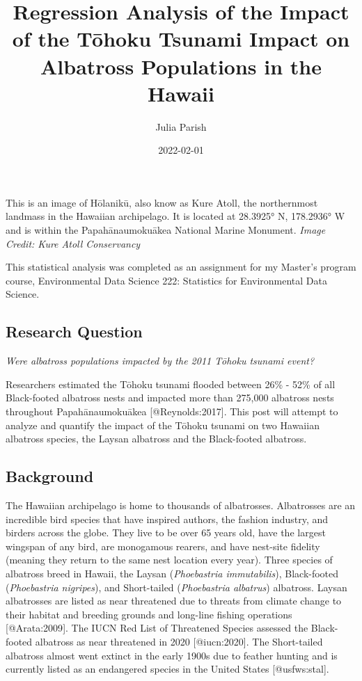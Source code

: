 \documentclass[
]{article}
\title{Regression Analysis of the Impact of the Tōhoku Tsunami Impact on
Albatross Populations in the Hawaii}
\author{Julia Parish}
\date{2022-02-01}
\begin{document}
\maketitle

{
\setcounter{tocdepth}{2}
\tableofcontents
}
This is an image of Hōlanikū, also know as Kure Atoll, the northernmost
landmass in the Hawaiian archipelago. It is located at 28.3925° N,
178.2936° W and is within the Papahānaumokuākea National Marine
Monument. \emph{Image Credit: Kure Atoll Conservancy}

This statistical analysis was completed as an assignment for my Master's
program course, Environmental Data Science 222: Statistics for
Environmental Data Science.

\hypertarget{research-question}{%
\subsection{Research Question}\label{research-question}}

\emph{Were albatross populations impacted by the 2011 Tōhoku tsunami
event?}

Researchers estimated the Tōhoku tsunami flooded between 26\% - 52\% of
all Black-footed albatross nests and impacted more than 275,000
albatross nests throughout Papahānaumokuākea {[}@Reynolds:2017{]}. This
post will attempt to analyze and quantify the impact of the Tōhoku
tsunami on two Hawaiian albatross species, the Laysan albatross and the
Black-footed albatross.

\hypertarget{background}{%
\subsection{Background}\label{background}}

The Hawaiian archipelago is home to thousands of albatrosses.
Albatrosses are an incredible bird species that have inspired authors,
the fashion industry, and birders across the globe. They live to be over
65 years old, have the largest wingspan of any bird, are monogamous
rearers, and have nest-site fidelity (meaning they return to the same
nest location every year). Three species of albatross breed in Hawaii,
the Laysan (\emph{Phoebastria immutabilis}), Black-footed
(\emph{Phoebastria nigripes}), and Short-tailed (\emph{Phoebastria
albatrus}) albatross. Laysan albatrosses are listed as near threatened
due to threats from climate change to their habitat and breeding grounds
and long-line fishing operations {[}@Arata:2009{]}. The IUCN Red List of
Threatened Species assessed the Black-footed albatross as near
threatened in 2020 {[}@iucn:2020{]}. The Short-tailed albatross almost
went extinct in the early 1900s due to feather hunting and is currently
listed as an endangered species in the United States {[}@usfws:stal{]}.
\end{document}
